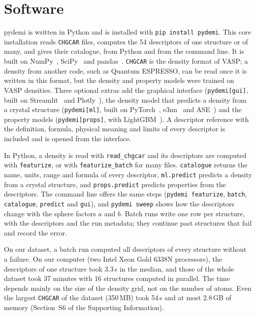 \documentclass[journal=jctcce,manuscript=article,email=true]{achemso}
\newcommand{\rev}[1]{{\color{blue}#1}}
\begin{document}
\section{Software}
\label{sec:software}

pydemi is written in Python and is installed with
\texttt{pip install pydemi}. This core installation reads \texttt{CHGCAR}
files, computes the \rev{54} descriptors of one structure or of many, and gives their
catalogue, from Python and from the command line. It is built on
NumPy~\cite{harris2020}, SciPy~\cite{virtanen2020} and
pandas~\cite{mckinney2010}. \texttt{CHGCAR} is the density format of VASP; a
density from another code, such as Quantum ESPRESSO, can be read once
it is written in this format, but the density and property models were trained
on VASP densities. Three optional extras add the graphical
interface (\texttt{pydemi[gui]}\rev{, built on Streamlit~\cite{streamlit} and
Plotly~\cite{plotly}}), the density
model that predicts a density from a crystal structure
(\texttt{pydemi[ml]}, built on PyTorch~\cite{paszke2019}, e3nn~\cite{geiger2022} and
ASE~\cite{larsen2017}) and the property models (\texttt{pydemi[props]},
with LightGBM~\cite{ke2017}). A descriptor reference with the definition, formula,
physical meaning and limits of every descriptor is included and is opened from
the interface.

In Python, a density is read with \texttt{read\_chgcar} and its descriptors are
computed with \texttt{featurize}, or with \texttt{featurize\_batch} for many
files. \texttt{catalogue} returns the name, units, range and formula of every
descriptor, \texttt{ml.predict} predicts a density from a crystal structure, and
\texttt{props.predict} predicts properties from the descriptors. The command
line offers the same steps (\texttt{pydemi featurize}, \texttt{batch},
\texttt{catalogue}, \texttt{predict} and \texttt{gui}), and \texttt{pydemi
sweep} shows how the descriptors change with the \rev{sphere factors $a$ and $b$}. Batch runs
write one row per structure, with the descriptors and the run metadata; they continue past structures that fail
and record the error.

On our dataset, a batch run computed all descriptors of every structure without
a failure. On our computer (two Intel Xeon Gold 6338N processors), the
descriptors of one structure took 3.3\,s in the median, and those of the whole
dataset took 37 minutes with 16 structures computed in parallel. The
time depends mainly on the size of the density grid, not on the number of
atoms. Even the largest \texttt{CHGCAR} of the dataset (350\,MB) took 54\,s
and \rev{at most 2.8}\,GB of memory (Section~S6 of the
Supporting Information).
\end{document}
